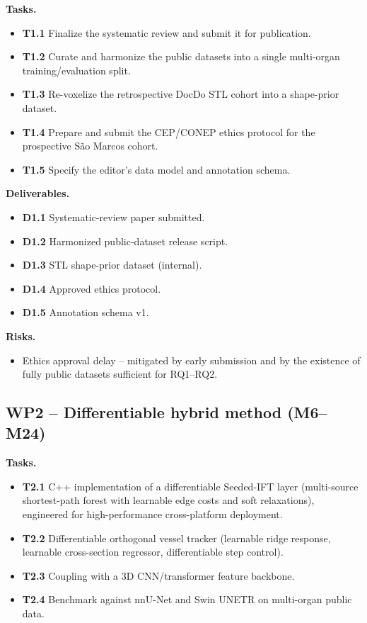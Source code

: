 \documentclass[a4paper,11pt,twoside]{article}
\begin{document}
\textbf{Tasks.}
\begin{itemize}[noitemsep, topsep=3pt]
  \item \textbf{T1.1} Finalize the systematic review and submit it for
        publication.
  \item \textbf{T1.2} Curate and harmonize the public datasets into a single
        multi-organ training/evaluation split.
  \item \textbf{T1.3} Re-voxelize the retrospective DocDo STL cohort into a
        shape-prior dataset.
  \item \textbf{T1.4} Prepare and submit the CEP/CONEP ethics protocol for the
        prospective S\~ao Marcos cohort.
  \item \textbf{T1.5} Specify the editor's data model and annotation schema.
\end{itemize}

\textbf{Deliverables.}
\begin{itemize}[noitemsep, topsep=3pt]
  \item \textbf{D1.1} Systematic-review paper submitted.
  \item \textbf{D1.2} Harmonized public-dataset release script.
  \item \textbf{D1.3} STL shape-prior dataset (internal).
  \item \textbf{D1.4} Approved ethics protocol.
  \item \textbf{D1.5} Annotation schema v1.
\end{itemize}

\textbf{Risks.}
\begin{itemize}[noitemsep, topsep=3pt]
  \item Ethics approval delay -- mitigated by early submission and by the
        existence of fully public datasets sufficient for RQ1--RQ2.
\end{itemize}

\subsection{WP2 -- Differentiable hybrid method (M6--M24)}

\textbf{Tasks.}
\begin{itemize}[noitemsep, topsep=3pt]
  \item \textbf{T2.1} C++ implementation of a differentiable Seeded-IFT
        layer (multi-source shortest-path forest with learnable edge costs and
        soft relaxations), engineered for high-performance cross-platform
        deployment.
  \item \textbf{T2.2} Differentiable orthogonal vessel tracker (learnable ridge
        response, learnable cross-section regressor, differentiable step
        control).
  \item \textbf{T2.3} Coupling with a 3D CNN/transformer feature backbone.
  \item \textbf{T2.4} Benchmark against nnU-Net and Swin UNETR on multi-organ
        public data.
\end{itemize}
\end{document}
